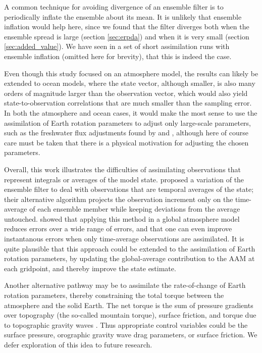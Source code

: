 A common technique for avoiding divergence of an ensemble filter is to periodically inflate the ensemble about its mean. 
It is unlikely that ensemble inflation would help here, since we found that the filter diverges both when the ensemble spread is large (section \ref{sec:erpda}) and when it is very small (section \ref{sec:added_value}). 
We have seen in a set of short assimilation runs with ensemble inflation (omitted here for brevity), that this is indeed the case. 


Even though this study focused on an atmosphere model, the results can likely be extended to ocean models, where the state vector, although smaller, is also many orders of magnitude larger than the observation vector, which would also yield state-to-observation correlations that are much smaller than the sampling error. 
In both the atmosphere and ocean cases, it would make the most sense to use the assimilation of Earth rotation parameters to adjust only large-scale parameters, such as the freshwater flux adjustments found by \citet{Saynisch2010} and \citet{Saynisch2012}, although here of course care must be taken that there is a physical motivation for adjusting the chosen parameters.  

Overall, this work illustrates the difficulties of assimilating observations that represent integrals or averages of the model state. 
\citet{Dirren2005} proposed a variation of the ensemble filter to deal with observations that are temporal averages of the state; their alternative algorithm projects the observation increment only on the time-average of each ensemble member while keeping deviations from the average untouched. 
\citet{Huntley2009} showed that applying this method in a global atmosphere model reduces errors over a wide range of errors, and that one can even improve instantanous errors when only time-average observations are assimilated. 
It is quite plausible that this approach could be extended to the assimilation of Earth rotation parameters, by updating the global-average contribution to the AAM at each gridpoint, and thereby improve the state estimate. 


Another alternative pathway may be to assimilate the rate-of-change of Earth rotation parameters, thereby constraining the total torque between the atmosphere and the solid Earth. 
The net torque is the sum of pressure gradients over topography (the so-called mountain torque), surface friction, and torque due to topographic gravity waves \citep{Lejenas1997}. 
Thus appropriate control variables could be the surface pressure, orographic gravity wave drag parameters, or surface friction. 
We defer exploration of this idea to future research. 


